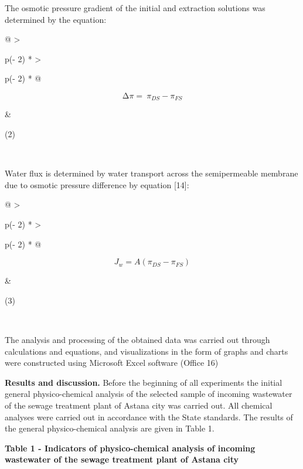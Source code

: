 The osmotic pressure gradient of the initial and extraction solutions
was determined by the equation:

\begin{longtable}[]{@{}
  >{\raggedright\arraybackslash}p{(\columnwidth - 2\tabcolsep) * }
  >{\raggedright\arraybackslash}p{(\columnwidth - 2\tabcolsep) * }@{}}
\toprule\noalign{}
\begin{minipage}[b]{\linewidth}\raggedright
\[\mathrm{\Delta}\pi = \ \pi_{DS} - \pi_{FS}\]
\end{minipage} & \begin{minipage}[b]{\linewidth}\raggedright
(2)
\end{minipage} \\
\midrule\noalign{}
\endhead
\bottomrule\noalign{}
\endlastfoot
\end{longtable}

Water flux is determined by water transport across the semipermeable
membrane due to osmotic pressure difference by equation {[}14{]}:

\begin{longtable}[]{@{}
  >{\raggedright\arraybackslash}p{(\columnwidth - 2\tabcolsep) * }
  >{\raggedright\arraybackslash}p{(\columnwidth - 2\tabcolsep) * }@{}}
\toprule\noalign{}
\begin{minipage}[b]{\linewidth}\raggedright
\[J_{w} = A(\pi_{DS} - \pi_{FS})\]
\end{minipage} & \begin{minipage}[b]{\linewidth}\raggedright
(3)
\end{minipage} \\
\midrule\noalign{}
\endhead
\bottomrule\noalign{}
\endlastfoot
\end{longtable}

The analysis and processing of the obtained data was carried out through
calculations and equations, and visualizations in the form of graphs and
charts were constructed using Microsoft Excel software (Office 16)

{\bfseries Results and discussion.} Before the beginning of all experiments
the initial general physico-chemical analysis of the selected sample of
incoming wastewater of the sewage treatment plant of Astana city was
carried out. All chemical analyses were carried out in accordance with
the State standards. The results of the general physico-chemical
analysis are given in Table 1.

{\bfseries Table 1 - Indicators of physico-chemical analysis of incoming
wastewater of the sewage treatment plant of Astana city}

